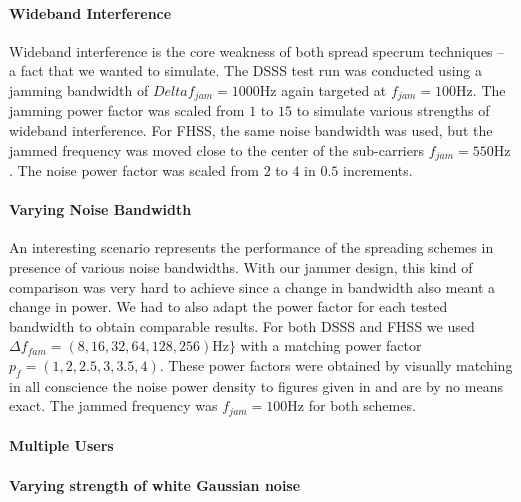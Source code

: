 	\paragraph{Wideband Interference}
	Wideband interference is the core weakness of both spread specrum techniques -- a fact that we wanted to simulate. The DSSS test run was conducted using a jamming bandwidth of $Delta f_{jam} = 1000\text{Hz}$ again targeted at $f_{jam} = 100\text{Hz}$. The jamming power factor was scaled from $1$ to $15$ to simulate various strengths of wideband interference. For FHSS, the same noise bandwidth was used, but the jammed frequency was moved close to the center of the sub-carriers $f_{jam} = 550\text{Hz}$. The noise power factor was scaled from $2$ to $4$ in $0.5$ increments.
	
	\paragraph{Varying Noise Bandwidth}	
	An interesting scenario represents the performance of the spreading schemes in presence of various noise bandwidths. With our jammer design, this kind of comparison was very hard to achieve since a change in bandwidth also meant a change in power. We had to also adapt the power factor for each tested bandwidth to obtain comparable results. For both DSSS and FHSS we used $\Delta f_{fam} = (8,16,32,64,128,256)\text{Hz}\}$ with a matching power factor $p_f = (1,2,2.5,3,3.5,4)$. These power factors were obtained by visually matching in all conscience the noise power density to figures given in \cite{web-nl} and are by no means exact. The jammed frequency was $f_{jam}=100\text{Hz}$ for both schemes.
	
	\paragraph{Multiple Users}	
	
	\paragraph{Varying strength of white Gaussian noise}
	
	
	
	